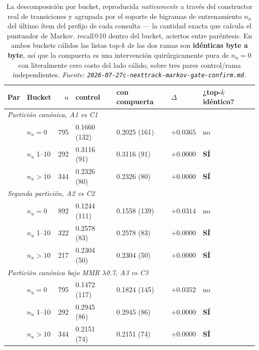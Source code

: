 \documentclass[11pt]{article}
\newcommand{\best}[1]{\textbf{#1}}
\begin{document}
\begin{table}[ht]
  \centering
  \caption{La descomposición por bucket, reproducida \emph{nativamente} a través
  del constructor real de transiciones y agrupada por el soporte de bigramas de
  entrenamiento $n_u$ del último ítem del prefijo de cada consulta --- la cantidad
  exacta que calcula el puntuador de Markov. recall@10 dentro del bucket, aciertos
  entre paréntesis. En ambos buckets cálidos las listas top-$k$ de las dos ramas
  son \textbf{idénticas byte a byte}, así que la compuerta es una intervención
  quirúrgicamente pura de $n_u=0$ con literalmente cero costo del lado cálido,
  sobre tres pares control/rama independientes.
  \emph{Fuente: \texttt{2026-07-27c-nexttrack-markov-gate-confirm.md}.}}
  \label{tab:nexttrack-markovgate-buckets}
  {\footnotesize\setlength{\tabcolsep}{5pt}\begin{tabular}{llrllll}
    \toprule
    Par & Bucket & $n$ & control & con compuerta & $\Delta$ & ¿top-$k$ idéntico? \\
    \midrule
    \multicolumn{7}{l}{\emph{Partición canónica, A1 vs C1}} \\
    & $n_u = 0$ & 795 & 0.1660 (132) & 0.2025 (161) & \best{$+0.0365$} & no \\
    & $n_u$ 1--10 & 292 & 0.3116 (91) & 0.3116 (91) & $+0.0000$ & \best{SÍ} \\
    & $n_u > 10$ & 344 & 0.2326 (80) & 0.2326 (80) & $+0.0000$ & \best{SÍ} \\
    \midrule
    \multicolumn{7}{l}{\emph{Segunda partición, A2 vs C2}} \\
    & $n_u = 0$ & 892 & 0.1244 (111) & 0.1558 (139) & \best{$+0.0314$} & no \\
    & $n_u$ 1--10 & 322 & 0.2578 (83) & 0.2578 (83) & $+0.0000$ & \best{SÍ} \\
    & $n_u > 10$ & 217 & 0.2304 (50) & 0.2304 (50) & $+0.0000$ & \best{SÍ} \\
    \midrule
    \multicolumn{7}{l}{\emph{Partición canónica bajo MMR $\lambda$0.7, A3 vs C3}} \\
    & $n_u = 0$ & 795 & 0.1472 (117) & 0.1824 (145) & \best{$+0.0352$} & no \\
    & $n_u$ 1--10 & 292 & 0.2945 (86) & 0.2945 (86) & $+0.0000$ & \best{SÍ} \\
    & $n_u > 10$ & 344 & 0.2151 (74) & 0.2151 (74) & $+0.0000$ & \best{SÍ} \\
    \bottomrule
  \end{tabular}}
\end{table}
\end{document}
